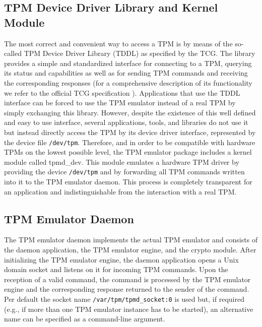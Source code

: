 \documentclass[11pt,letterpaper]{article}
\newcommand{\file}[1]{\small\texttt{#1}\normalsize}
\begin{document}

\subsection{TPM Device Driver Library and Kernel Module}
The most correct and convenient way to access a TPM is by means of the so-called TPM Device Driver
Library (TDDL) as specified by the TCG. The library provides a simple and standardized interface for
connecting to a TPM, querying its status and capabilities as well as for sending TPM commands and
receiving the corresponding responses (for a comprehensive description of its functionality we
refer to the official TCG specification \cite{TSS}). Applications that use the TDDL interface can
be forced to use the TPM emulator instead of a real TPM by simply exchanging this library. However,
despite the existence of this well defined and easy to use interface, several applications, tools,
and libraries do not use it but instead directly access the TPM by its device driver interface,
represented by the device file \file{/dev/tpm}. Therefore, and in order to be compatible with
hardware TPMs on the lowest possible level, the TPM emulator package includes a kernel module called
tpmd\_dev. This module emulates a hardware TPM driver by providing the device \file{/dev/tpm} and
by forwarding all TPM commands written into it to the TPM emulator daemon. This process is
completely transparent for an application and indistinguishable from the interaction with a real TPM.

\subsection{TPM Emulator Daemon}
The TPM emulator daemon implements the actual TPM emulator and consists of the daemon application,
the TPM emulator engine, and the crypto module. After initializing the TPM emulator engine, the
daemon application opens a Unix domain socket and listens on it for incoming TPM commands. Upon
the reception of a valid command, the command is processed by the TPM emulator engine and the
corresponding response returned to the sender of the  command. Per default the socket name
\file{/var/tpm/tpmd\_socket:0} is used but, if required (e.g., if more than one TPM emulator
instance has to be started), an alternative name can be specified as a command-line argument.
\end{document}
